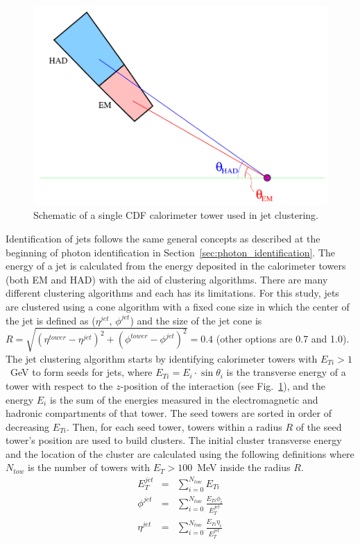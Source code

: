 \begin{figure}[p]
 \centering
 \includegraphics[scale=.5]{./JetClust_SingleCaloTower.png}
 \caption{Schematic of a single CDF calorimeter tower used in jet clustering.}
 \label{fig:jetClus_CaloTower}
\end{figure}


Identification of jets follows the same general concepts as described at the beginning of photon identification in Section~\ref{sec:photon_identification}. The energy of a jet is calculated from the energy deposited in the calorimeter towers (both EM and HAD) with the aid of clustering algorithms. There are many different clustering algorithms and each has its limitations. For this study, jets are clustered using a cone algorithm with a fixed cone size in which the center of the jet is defined as ($\eta^{jet}$, $\phi^{jet}$) and the size of the jet cone is $R = \sqrt{(\eta^{tower} - \eta^{jet})^{2} + (\phi^{tower} - \phi^{jet})^{2}} = 0.4$ (other options are 0.7 and 1.0). The jet clustering algorithm starts by identifying calorimeter towers with $E_{Ti}>1$~GeV to form seeds for jets, where $E_{Ti} = E_{i}\cdot\sin\theta _{i}$ is the transverse energy of a tower with respect to the $z$-position of the \ppbar interaction (see Fig.~\ref{fig:jetClus_CaloTower}), and the energy $E_{i}$ is the sum of the energies measured in the electromagnetic and hadronic compartments of that tower. The seed towers are sorted in order of decreasing $E_{Ti}$. Then, for each seed tower, towers within a radius $R$ of the seed tower's position are used to build clusters. The initial cluster transverse energy and the location of the cluster are calculated using the following definitions where $N_{tow}$ is the number of towers with $E_{T}>100$~MeV inside the radius $R$.
\begin{eqnarray}
 E^{jet}_{T} &=& \sum_{i=0}^{N_{tow}} E_{Ti}\\
 \phi^{jet} &=& \sum_{i=0}^{N_{tow}} \frac{E_{Ti}\phi_i}{E^{jet}_{T}}\\
 \eta^{jet} &=& \sum_{i=0}^{N_{tow}} \frac{E_{Ti}\eta_i}{E^{jet}_{T}}
\end{eqnarray}


